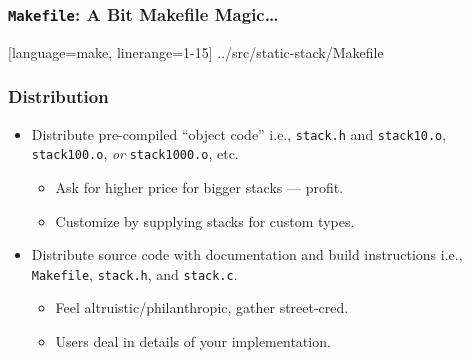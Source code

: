 \begin{frame}[fragile]

\frametitle{\texttt{Makefile}: A Bit Makefile Magic\ldots}

%
  [language=make, linerange={1-15}]%
  {../src/static-stack/Makefile}

\end{frame}



\begin{frame}

\frametitle{Distribution}

\begin{itemize}

\item Distribute pre-compiled ``object code'' i.e., \texttt{stack.h} and
\texttt{stack10.o}, \texttt{stack100.o}, \emph{or} \texttt{stack1000.o}, etc.

\begin{itemize}

\item Ask for higher price for bigger stacks --- profit.

\item Customize by supplying stacks for custom types.

\end{itemize}

\item Distribute source code with documentation and build instructions i.e.,
\texttt{Makefile}, \texttt{stack.h}, and \texttt{stack.c}.

\begin{itemize}

\item Feel altruistic/philanthropic, gather street-cred.

\item Users deal in details of your implementation.

\end{itemize}

\end{itemize}

\end{frame}



